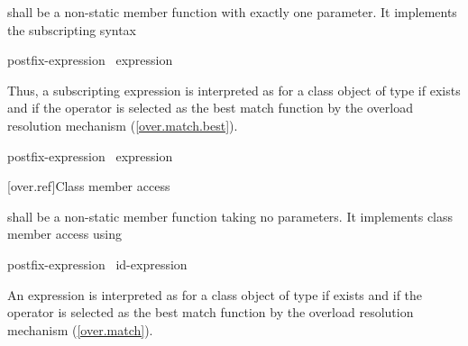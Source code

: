 \documentclass[american]{book}
\begin{document}
\pnum
{}%
shall be a non-static member function with exactly one parameter.
It implements the subscripting syntax

\begin{ncsimplebnf}
postfix-expression \terminal{[}\ expression \terminal{]}
\end{ncsimplebnf}

Thus, a subscripting expression
is interpreted as
for a class object
of type
if
exists and if the operator is selected as the best match function by
the overload resolution mechanism (\ref{over.match.best}).

\pnum
{}

\color{addclr}
\begin{ncsimplebnf}
postfix-expression \terminal{[}\ expression \terminal{]}
\end{ncsimplebnf}
\color{black}


[over.ref]{Class member access}

\pnum
{}%
shall be a non-static member function taking no parameters.
It implements class member access using
\tcode{->}

\begin{ncsimplebnf}
postfix-expression \terminal{->}\ id-expression
\end{ncsimplebnf}

An expression
is interpreted as
for a class object
of type
if
exists and if the operator is selected as the best match function by
the overload resolution mechanism (\ref{over.match}).

\pnum
{}%
\end{document}
